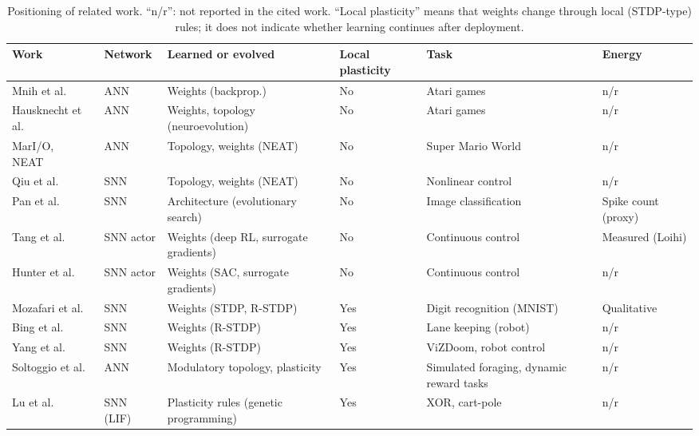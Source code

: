 \begin{table}[t]
  \centering
  \footnotesize
  \setlength{\tabcolsep}{4pt}
  \renewcommand{\arraystretch}{1.15}
  \caption{Positioning of related work. ``n/r'': not reported in the cited work. ``Local plasticity'' means that weights change through local (STDP-type) rules; it does not indicate whether learning continues after deployment.}
  \label{tab:related-work}
  \begin{tabularx}{\textwidth}{@{}>{\raggedright\arraybackslash}p{2.9cm}>{\raggedright\arraybackslash}p{1.5cm}Y>{\raggedright\arraybackslash}p{1.2cm}Y>{\raggedright\arraybackslash}p{1.7cm}@{}}
    \toprule
    Work & Network & Learned or evolved & Local plasticity & Task & Energy \\
    \midrule
    Mnih et al.~\cite{mnih2015human} & ANN & Weights (backprop.) & No & Atari games & n/r \\
    Hausknecht et al.~\cite{hausknecht2014atari} & ANN & Weights, topology (neuroevolution) & No & Atari games & n/r \\
    MarI/O, NEAT~\cite{sethbling2015mario,stanley2002} & ANN & Topology, weights (NEAT) & No & Super Mario World & n/r \\
    Qiu et al.~\cite{qiu2018evolving} & SNN & Topology, weights (NEAT) & No & Nonlinear control & n/r \\
    Pan et al.~\cite{zhang2024brain} & SNN & Architecture (evolutionary search) & No & Image classification & Spike count (proxy) \\
    Tang et al.~\cite{tang2021popsan} & SNN actor & Weights (deep RL, surrogate gradients) & No & Continuous control & Measured (Loihi) \\
    Hunter et al.~\cite{tang2026spiking} & SNN actor & Weights (SAC, surrogate gradients) & No & Continuous control & n/r \\
    Mozafari et al.~\cite{mozafari2018} & SNN & Weights (STDP, R-STDP) & Yes & Digit recognition (MNIST) & Qualitative \\
    Bing et al.~\cite{bing2018lane} & SNN & Weights (R-STDP) & Yes & Lane keeping (robot) & n/r \\
    Yang et al.~\cite{yang2025svpg} & SNN & Weights (R-STDP) & Yes & ViZDoom, robot control & n/r \\
    Soltoggio et al.~\cite{soltoggio2007,soltoggio2008} & ANN & Modulatory topology, plasticity & Yes & Simulated foraging, dynamic reward tasks & n/r \\
    Lu et al.~\cite{lu2022evolving} & SNN (LIF) & Plasticity rules (genetic programming) & Yes & XOR, cart-pole & n/r \\

\end{tabularx}
\end{table}
